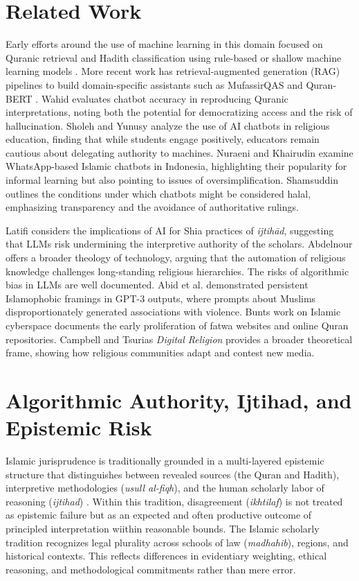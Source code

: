 \documentclass{article}
\begin{document}
\section{Related Work}
Early efforts around the use of machine learning in this domain focused on Quranic retrieval and Hadith classification using rule-based or shallow machine learning models \citep{shatnawi2014, hussein2018}. More recent work has retrieval-augmented generation (RAG) pipelines to build domain-specific assistants such as MufassirQAS and Quran-BERT \citep{quranbert2021}. Wahid \citep{wahid2025} evaluates chatbot accuracy in reproducing Quranic interpretations, noting both the potential for democratizing access and the risk of hallucination. Sholeh and Yunusy \citep{sholeh2024} analyze the use of AI chatbots in religious education, finding that while students engage positively, educators remain cautious about delegating authority to machines. Nuraeni and Khairudin \citep{nuraeni2025} examine WhatsApp-based Islamic chatbots in Indonesia, highlighting their popularity for informal learning but also pointing to issues of oversimplification.  Shamsuddin \citep{shamsuddin2024} outlines the conditions under which chatbots might be considered halal, emphasizing transparency and the avoidance of authoritative rulings. 

Latifi \citep{latifi2024} considers the implications of AI for Shia practices of \textit{ijtihād}, suggesting that LLMs risk undermining the interpretive authority of the scholars. Abdelnour \citep{abdelnour2025} offers a broader theology of technology, arguing that the automation of religious knowledge challenges long-standing religious hierarchies. The risks of algorithmic bias in LLMs are well documented. Abid et al. \citep{abid2021} demonstrated persistent Islamophobic framings in GPT-3 outputs, where prompts about Muslims disproportionately generated associations with violence. Bunts work on Islamic cyberspace \citep{bunt2009} documents the early proliferation of fatwa websites and online Quran repositories. Campbell and Tsurias \textit{Digital Religion} \citep{campbell2021} provides a broader theoretical frame, showing how religious communities adapt and contest new media. 

\section{Algorithmic Authority, Ijtihad, and Epistemic Risk}
Islamic jurisprudence is traditionally grounded in a multi-layered epistemic structure that distinguishes between revealed sources (the Quran and Hadith), interpretive methodologies (\emph{usull al-fiqh}), and the human scholarly labor of reasoning (\emph{ijtihad}) \citep{quraishi2001principles}\citep{lowry2007early}. Within this tradition, disagreement (\emph{ikhtilaf}) is not treated as epistemic failure but as an expected and often productive outcome of principled interpretation wiithin reasonable bounds. The Islamic scholarly tradition recognizes legal plurality across schools of law (\emph{madhahib}), regions, and historical contexts. This reflects differences in evidentiary weighting, ethical reasoning, and methodological commitments rather than mere error.
\end{document}
